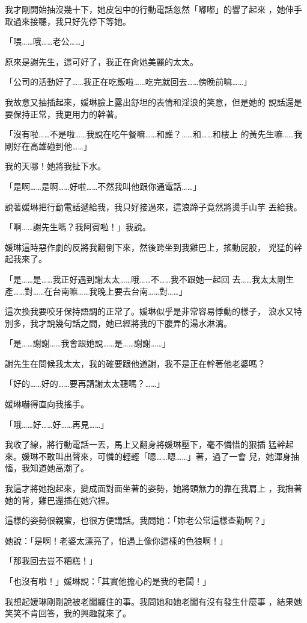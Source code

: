 我才剛開始抽沒幾十下，她皮包中的行動電話忽然「嘟嘟」的響了起來
，她伸手取過來接聽，我只好先停下等她。

「喂……哦……老公……」

原來是謝先生，這可好了，我正在肏她美麗的太太。

「公司的活動好了……我正在吃飯啦……吃完就回去……傍晚前嘛……」

我故意又抽插起來，媛琳臉上露出舒坦的表情和淫浪的笑意，但是她的
說話還是要保持正常，我更用力的幹著。

「沒有啦……不是啦……我說在吃午餐嘛……和誰？……和……和樓上
的黃先生嘛……我剛好在高雄碰到他……」

我的天哪！她將我扯下水。

「是啊……是啊……好啦……不然我叫他跟你通電話……」

說著媛琳把行動電話遞給我，我只好接過來，這浪蹄子竟然將燙手山芋
丟給我。

「啊……謝先生嗎？我阿賓啦！」我說。

媛琳這時惡作劇的反將我翻倒下來，然後跨坐到我雞巴上，搖動屁股，
兇猛的幹起我來了。

「是……是……我正好遇到謝太太……哦……不……我不跟她一起回
去……我太太剛生產……對……在台南嘛……我晚上要去台南……對……」

這次換我要咬牙保持語調的正常了。媛琳似乎是非常容易悸動的樣子，
浪水又特別多，我才說幾句話之間，她已經將我的下腹弄的湯水淋漓。

「是……謝謝……我會跟她說……是……謝謝……」

謝先生在問候我太太，我的確要跟他道謝，我不是正在幹著他老婆嗎？

「好的……好的……要再請謝太太聽嗎？……」

媛琳嚇得直向我搖手。

「哦……好……好……再見……」

我收了線，將行動電話一丟，馬上又翻身將媛琳壓下，毫不憐惜的狠插
猛幹起來。媛琳不敢叫出聲來，可憐的輕輕「嗯……嗯……」著，過了一會
兒，她渾身抽慉，我知道她高潮了。

我這才將她抱起來，變成面對面坐著的姿勢，她將頭無力的靠在我肩上
，我撫著她的背，雞巴還插在她穴裡。

這樣的姿勢很親蜜，也很方便講話。我問她：「妳老公常這樣查勤啊？」

她說：「是啊！老婆太漂亮了，怕遇上像你這樣的色狼啊！」

「那我回去豈不糟糕！」

「也沒有啦！」媛琳說：「其實他擔心的是我的老闆！」

我想起媛琳剛剛說被老闆纏住的事。我問她和她老闆有沒有發生什麼事
，結果她笑笑不肯回答，我的興趣就來了。

